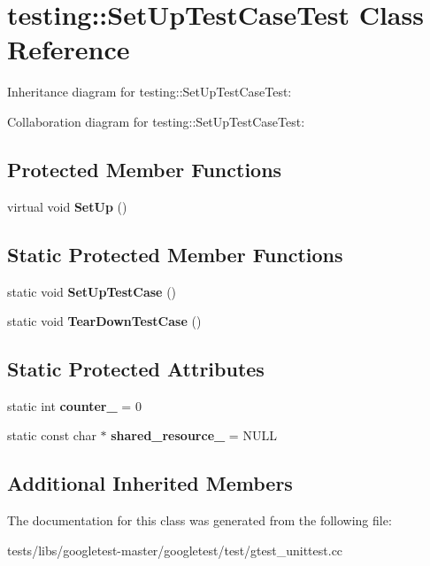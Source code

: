 \hypertarget{classtesting_1_1SetUpTestCaseTest}{}\section{testing\+:\+:Set\+Up\+Test\+Case\+Test Class Reference}
\label{classtesting_1_1SetUpTestCaseTest}


Inheritance diagram for testing\+:\+:Set\+Up\+Test\+Case\+Test\+:


Collaboration diagram for testing\+:\+:Set\+Up\+Test\+Case\+Test\+:
\subsection*{Protected Member Functions}
\begin{DoxyCompactItemize}
\item 
\mbox{\label{classtesting_1_1SetUpTestCaseTest_a4b44551ccf73e66de7ec95b2ab3b2085}} 
virtual void {\bfseries Set\+Up} ()
\end{DoxyCompactItemize}
\subsection*{Static Protected Member Functions}
\begin{DoxyCompactItemize}
\item 
\mbox{\label{classtesting_1_1SetUpTestCaseTest_a50732abc0bcb3725e6dfd6a2d487e944}} 
static void {\bfseries Set\+Up\+Test\+Case} ()
\item 
\mbox{\label{classtesting_1_1SetUpTestCaseTest_abdc133cd161ff2fa317f489da9bdccf3}} 
static void {\bfseries Tear\+Down\+Test\+Case} ()
\end{DoxyCompactItemize}
\subsection*{Static Protected Attributes}
\begin{DoxyCompactItemize}
\item 
\mbox{\label{classtesting_1_1SetUpTestCaseTest_a5b6e811128d35389be49f6569bf93817}} 
static int {\bfseries counter\+\_\+} = 0
\item 
\mbox{\label{classtesting_1_1SetUpTestCaseTest_a904e77fd9a628b6a9aca0280665fd040}} 
static const char $\ast$ {\bfseries shared\+\_\+resource\+\_\+} = N\+U\+LL
\end{DoxyCompactItemize}
\subsection*{Additional Inherited Members}


The documentation for this class was generated from the following file\+:\begin{DoxyCompactItemize}
\item 
tests/libs/googletest-\/master/googletest/test/gtest\+\_\+unittest.\+cc\end{DoxyCompactItemize}
